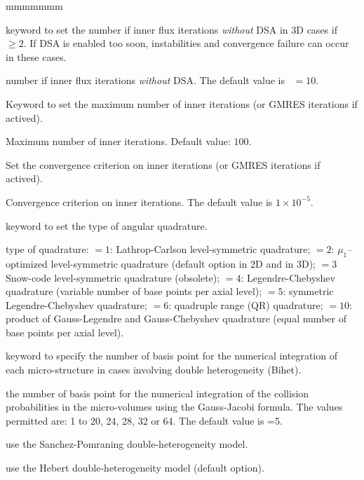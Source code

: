 \begin{ListeDeDescription}{mmmmmmm}
\item[\moc{NSDSA}] keyword to set the number if inner flux iterations {\sl without} DSA in 3D
cases if ~$\ge 2$. If DSA is enabled too soon, instabilities and convergence failure can occur in these cases.

\item[\dusa{nsdsa}] number if inner flux iterations {\sl without} DSA. The default value is ~$=10$.

\item[\moc{MAXI}] Keyword to set the maximum number of inner iterations (or GMRES iterations if actived).
\item[\dusa{maxi}] Maximum number of inner iterations. Default value: $100$.

\item[\moc{EPSI}] Set the convergence criterion on inner iterations (or GMRES iterations if actived).
\item[\dusa{epsi}] Convergence criterion on inner iterations. The default value is $1\times 10^{-5}$.
\item[\moc{QUAD}] keyword to set the type of angular quadrature.

\item[\dusa{iquad}] type of quadrature: $=1$: Lathrop-Carlson level-symmetric quadrature;
$=2$: $\mu_1$--optimi\-zed level-symmetric quadrature (default option in 2D and in 3D); $=3$ Snow-code level-symmetric quadrature
(obsolete); $=4$: Legendre-Chebyshev quadrature (variable number of base points
per axial level); $=5$: symmetric Legendre-Chebyshev quadrature; $=6$: quadruple range (QR)
quadrature;\cite{quadrupole} $=10$: product of Gauss-Legendre and Gauss-Chebyshev quadrature (equal
number of base points per axial level).

\item[\moc{QUAB}] keyword to specify the number of basis point for the
numerical integration of each micro-structure in cases involving double
heterogeneity (Bihet).

\item[\dusa{iquab}] the number of basis point for the numerical integration of
the collision probabilities in the micro-volumes using the  Gauss-Jacobi
formula. The values permitted are: 1 to 20, 24, 28, 32 or  64. The default value
is =5.

\item[\moc{SAPO}] use the Sanchez-Pomraning double-heterogeneity model.\cite{sapo}

\item[\moc{HEBE}] use the Hebert double-heterogeneity model (default option).\cite{BIHET}

\end{ListeDeDescription}

\eject
